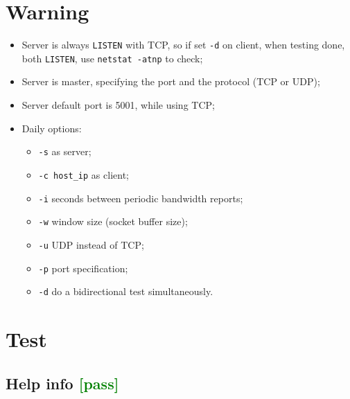 \documentclass[a4paper]{report}
\begin{document}
\section{Warning}
\begin{itemize}
    \item Server is always {\tt LISTEN} with TCP, so if set {\tt -d} on client, 
          when testing done, both {\tt LISTEN}, use {\tt netstat -atnp} to check;
    \item Server is master, specifying the port and the protocol (TCP or UDP);
    \item Server default port is 5001, while using TCP;
    \item Daily options:
    \begin{itemize}
        \item {\tt -s} as server;
        \item {\tt -c host\_ip} as client;
        \item {\tt -i} seconds between periodic bandwidth reports;
        \item {\tt -w} window size (socket buffer size);
        \item {\tt -u} UDP instead of TCP;
        \item {\tt -p} port specification;
        \item {\tt -d} do a bidirectional test simultaneously.
    \end{itemize}
\end{itemize}
\section{Test}
\subsection{Help info \textcolor{green}{[pass]}}
\end{document}
